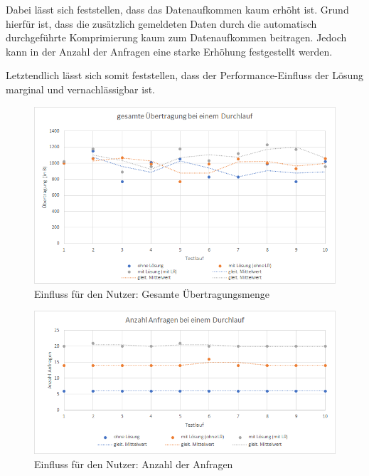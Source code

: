 Dabei lässt sich feststellen, dass das Datenaufkommen kaum erhöht ist. Grund hierfür ist, dass die zusätzlich gemeldeten Daten durch die automatisch durchgeführte Komprimierung\footnotemark{} kaum zum Datenaufkommen beitragen. Jedoch kann in der Anzahl der Anfragen eine starke Erhöhung festgestellt werden.

Letztendlich lässt sich somit feststellen, dass der Performance-Einfluss der Lösung marginal und vernachlässigbar ist.


\begin{figure}[H]
	\centering
	\includegraphics[width=1.00\linewidth]{data/Einfluss-fuer-den-Nutzer/Einfluss-fuer-den-Nutzer_gesamte-Uebertragung.png}
	\caption{Einfluss für den Nutzer: Gesamte Übertragungsmenge}
	\label{fig:Einfluss-fuer-den-Nutzer_gesamte-Uebertragung}
\end{figure}

\begin{figure}[H]
	\centering
	\includegraphics[width=1.00\linewidth]{data/Einfluss-fuer-den-Nutzer/Einfluss-fuer-den-Nutzer_Anzahl-Anfragen.png}
	\caption{Einfluss für den Nutzer: Anzahl der Anfragen}
	\label{fig:Einfluss-fuer-den-Nutzer_Anzahl-Anfragen}
\end{figure}
